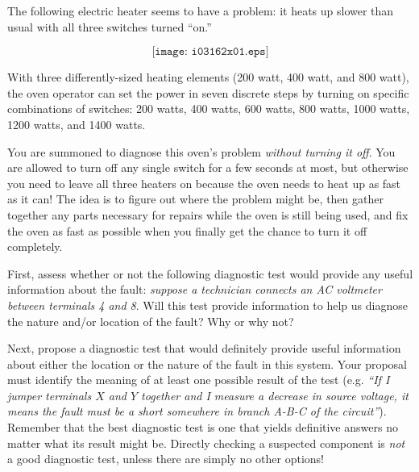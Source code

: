 

The following electric heater seems to have a problem: it heats up slower than usual with all three switches turned ``on.''

$$\texttt{[image: i03162x01.eps]}$$

With three differently-sized heating elements (200 watt, 400 watt, and 800 watt), the oven operator can set the power in seven discrete steps by turning on specific combinations of switches: 200 watts, 400 watts, 600 watts, 800 watts, 1000 watts, 1200 watts, and 1400 watts.

You are summoned to diagnose this oven's problem {\it without turning it off}.  You are allowed to turn off any single switch for a few seconds at most, but otherwise you need to leave all three heaters on because the oven needs to heat up as fast as it can!  The idea is to figure out where the problem might be, then gather together any parts necessary for repairs while the oven is still being used, and fix the oven as fast as possible when you finally get the chance to turn it off completely.

\vskip 10pt

First, assess whether or not the following diagnostic test would provide any useful information about the fault: {\it suppose a technician connects an AC voltmeter between terminals 4 and 8}.  Will this test provide information to help us diagnose the nature and/or location of the fault?  Why or why not?

\vskip 30pt

Next, propose a diagnostic test that would definitely provide useful information about either the location or the nature of the fault in this system.  Your proposal must identify the meaning of at least one possible result of the test (e.g. {\it ``If I jumper terminals $X$ and $Y$ together and I measure a decrease in source voltage, it means the fault must be a short somewhere in branch A-B-C of the circuit''}).  Remember that the best diagnostic test is one that yields definitive answers no matter what its result might be.  Directly checking a suspected component is {\it not} a good diagnostic test, unless there are simply no other options!


\vfil 

\eject





